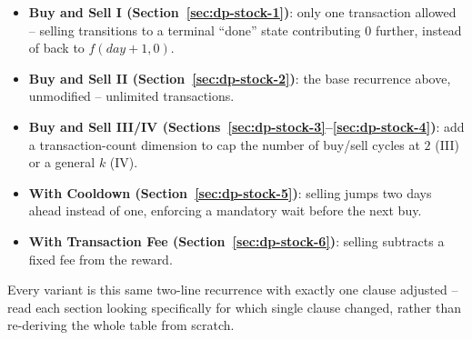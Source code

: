 \begin{patternbox}
\begin{itemize}
  \item \textbf{Buy and Sell I (Section~\ref{sec:dp-stock-1})}: only one
        transaction allowed -- selling transitions to a terminal
        ``done'' state contributing $0$ further, instead of back to
        $f(\textit{day}{+}1, 0)$.
  \item \textbf{Buy and Sell II (Section~\ref{sec:dp-stock-2})}: the
        base recurrence above, unmodified -- unlimited transactions.
  \item \textbf{Buy and Sell III/IV (Sections~\ref{sec:dp-stock-3}--\ref{sec:dp-stock-4})}:
        add a transaction-count dimension to cap the number of
        buy/sell cycles at $2$ (III) or a general $k$ (IV).
  \item \textbf{With Cooldown (Section~\ref{sec:dp-stock-5})}: selling
        jumps two days ahead instead of one, enforcing a mandatory
        wait before the next buy.
  \item \textbf{With Transaction Fee (Section~\ref{sec:dp-stock-6})}:
        selling subtracts a fixed fee from the reward.
  \end{itemize}
Every variant is this same two-line recurrence with exactly one clause
adjusted -- read each section looking specifically for which single
clause changed, rather than re-deriving the whole table from scratch.
\end{patternbox}

\newpage







